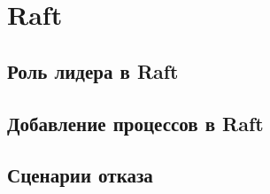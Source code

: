 \section{Raft}

\subsection{Роль лидера в Raft}
\subsection{Добавление процессов в Raft}
\subsection{Сценарии отказа}
